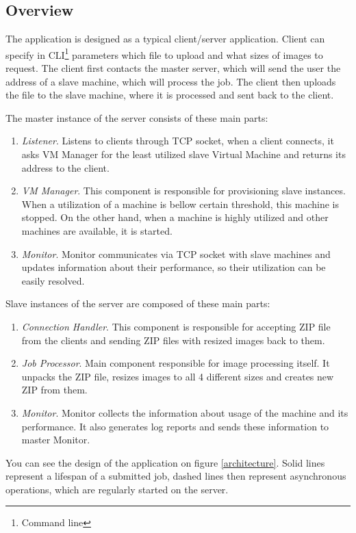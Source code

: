 \subsection{Overview}
The application is designed as a typical client/server application. Client can specify in CLI\footnote{Command line} parameters which file to upload and what sizes of images to request. The client first contacts the master server, which will send the user the address of a slave machine, which will process the job. The client then uploads the file to the slave machine, where it is processed and sent back to the client.

The master instance of the server consists of these main parts:

\begin{enumerate}
 \item \emph{Listener}. Listens to clients through TCP socket, when a client connects, it asks VM Manager for the least utilized slave Virtual Machine and returns its address to the client.
 \item \emph{VM Manager}. This component is responsible for provisioning slave instances. When a utilization of a machine is bellow certain threshold, this machine is stopped. On the other hand, when a machine is highly utilized and other machines  are available, it is started.
 \item \emph{Monitor}. Monitor communicates via TCP socket with slave machines and updates information about their performance, so their utilization can  be easily resolved.
\end{enumerate}

Slave instances of the server are composed of these main parts:

\begin{enumerate}
 \item \emph{Connection Handler}. This component is responsible for accepting ZIP file from the clients and sending ZIP files with resized images back to them.
 \item \emph{Job Processor}. Main component responsible for image processing itself. It unpacks the ZIP file, resizes images to all 4 different sizes and creates new ZIP from them.
 \item \emph{Monitor}. Monitor collects the information about usage of the machine and its performance. It also generates log reports and sends these information to master Monitor.
\end{enumerate}

You can see the design of the application on figure \ref{architecture}. Solid lines represent a lifespan of a submitted job, dashed lines then represent asynchronous operations, which are regularly started on the server. 

